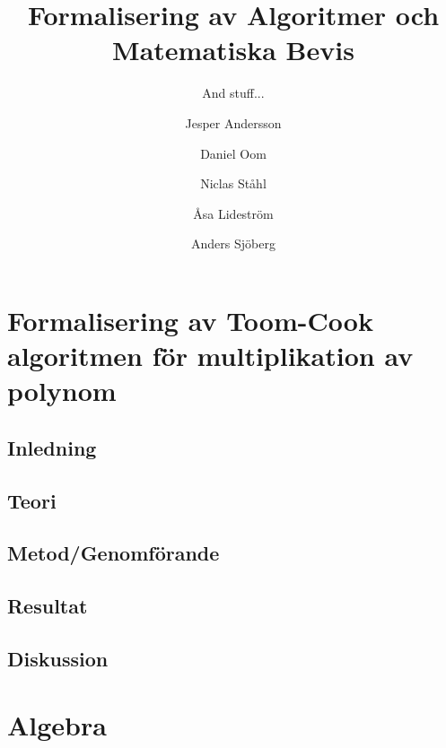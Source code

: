 \documentclass[bachelors,a4paper,gu]{chalmers-thesis}
\title{Formalisering av Algoritmer och Matematiska Bevis}
\subtitle{And stuff...}
\author{Jesper Andersson\and Daniel Oom\and Niclas Ståhl\and Åsa Lideström\and Anders Sjöberg}
\begin{document}
\maketitle

\chapter{Formalisering av Toom-Cook algoritmen för multiplikation av polynom}

\section{Inledning}

\section{Teori}




\section{Metod/Genomförande}

\section{Resultat}


\section{Diskussion}


\nocite{*} %
\printbibliography

\appendix
\chapter{Algebra}

\end{document}
